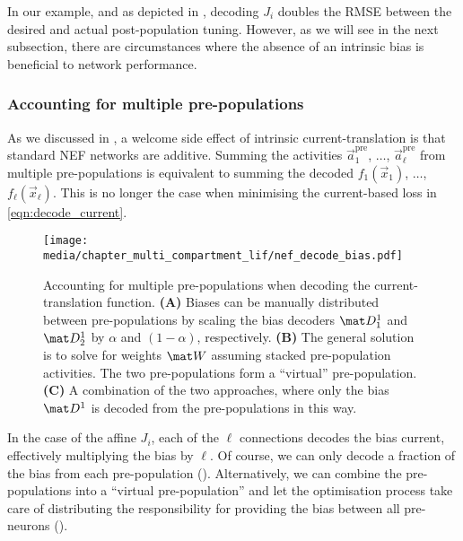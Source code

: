 In our example, and as depicted in , decoding $J_i$ doubles the RMSE between the desired and actual post-population tuning.
However, as we will see in the next subsection, there are circumstances where the absence of an intrinsic bias is beneficial to network performance.

\subsubsection{Accounting for multiple pre-populations}
As we discussed in , a welcome side effect of intrinsic current-translation is that standard NEF networks are additive.
Summing the activities $\vec a^\mathrm{pre}_1$, $\ldots$, $\vec a^\mathrm{pre}_\ell$ from multiple pre-populations is equivalent to summing the decoded $f_1(\vec x_1)$, $\ldots$, $f_\ell(\vec x_\ell)$.
This is no longer the case when
minimising the current-based loss in \cref{eqn:decode_current}.

\begin{figure}
	\texttt{[image: media/chapter\_multi\_compartment\_lif/nef\_decode\_bias.pdf]}%
	{\label{fig:nef_decode_bias_a}}%
	{\label{fig:nef_decode_bias_b}}%
	{\label{fig:nef_decode_bias_c}}%
	\caption[Accounting for multiple pre-populations when decoding the current-translation function.]{Accounting for multiple pre-populations when decoding the current-translation function. \textbf{(A)} Biases can be manually distributed between pre-populations by scaling the bias decoders $\mat D^1_1$ and $\mat D^1_2$ by $\alpha$ and $(1 - \alpha)$, respectively. \textbf{(B)} The general solution is to solve for weights $\mat W$ assuming stacked pre-population activities. The two pre-populations form a \enquote{virtual} pre-population. \textbf{(C)} A combination of the two approaches, where only the bias $\mat D^1$ is decoded from the pre-populations in this way.}
\end{figure}

In the case of the affine $J_i$, each of the $\ell$ connections decodes the bias current, effectively multiplying the bias by $\ell$.
Of course, we can only decode a fraction of the bias from each pre-population ().
Alternatively, we can combine the pre-populations into a \enquote{virtual pre-population} and let the optimisation process take care of distributing the responsibility for providing the bias between all pre-neurons ().

